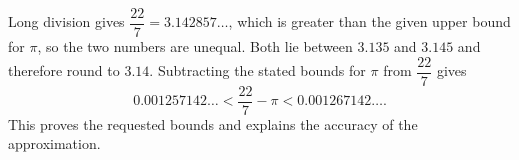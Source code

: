 Long division gives $\dfrac{22}{7}=3.142857\ldots$, which is greater than the given upper bound for $\pi$, so the two numbers are unequal. Both lie between $3.135$ and $3.145$ and therefore round to $3.14$. Subtracting the stated bounds for $\pi$ from $\dfrac{22}{7}$ gives
\[0.001257142\ldots<\dfrac{22}{7}-\pi<0.001267142\ldots.\]
This proves the requested bounds and explains the accuracy of the approximation.
